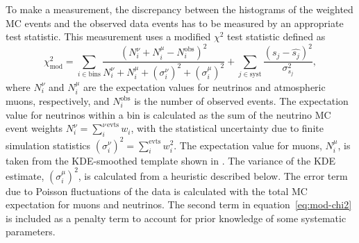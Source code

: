 To make a measurement, the discrepancy between the histograms of the weighted MC events and the observed data events has to be measured by an appropriate test statistic. This measurement uses a modified $\chi^2$ test statistic defined as
\begin{equation}
\chi^2_{\mathrm{mod}} = \sum_{i \in \mathrm{bins}}^{}\frac{(N^{\nu}_i + N^{\mu}_i - N^{\mathrm{obs}}_i)^2}{N^{\nu}_i + N^{\mu}_i + (\sigma^{\nu}_i)^2 + (\sigma^{\mu}_i)^2} + \sum_{j \in \mathrm{syst}}^{}\frac{(s_j - \hat{s_j})^2}{\sigma^2_{s_j}},
\label{eq:mod-chi2}
\end{equation}
\noindent where $N^{\nu}_i$ and $N^{\mu}_i$ are the expectation values for neutrinos and atmospheric muons, respectively, and $N^{\mathrm{obs}}_i$ is the number of observed events. The expectation value for neutrinos within a bin is calculated as the sum of the neutrino MC event weights $N^{\nu}_i = \sum_{i}^{\nu\,\mathrm{evts}} w_i$, with the statistical uncertainty due to finite simulation statistics $(\sigma^{\nu}_i)^2 = \sum_{i}^{\mathrm{evts}} w_i^2$. The expectation value for muons, $N^{\mu}_i$, is taken from the KDE-smoothed template shown in . The variance of the KDE estimate, $(\sigma^{\mu}_i)^2$, is calculated from a heuristic described below. The error term due to Poisson fluctuations of the data is calculated with the total MC expectation for muons and neutrinos. The second term in equation~\ref{eq:mod-chi2} is included as a penalty term to account for prior knowledge of some systematic parameters.

